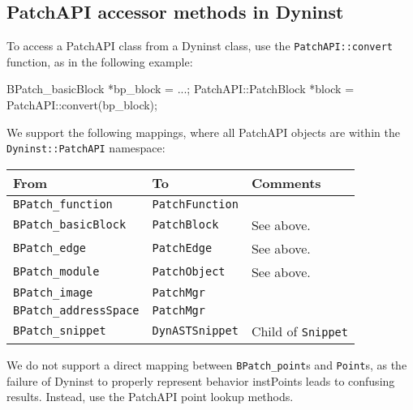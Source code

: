 \subsection{PatchAPI accessor methods in Dyninst}

To access a PatchAPI class from a Dyninst class, use
the \texttt{PatchAPI::convert} function, as in the following example:

\begin{apient}
  BPatch_basicBlock *bp_block = ...;
  PatchAPI::PatchBlock *block = PatchAPI::convert(bp_block);
\end{apient}

We support the following mappings, where all PatchAPI objects
are within the \texttt{Dyninst::PatchAPI} namespace:

\begin{tabular}{|l|l|l|}
\hline
From & To & Comments \\
\hline 
\texttt{BPatch\_function} & \texttt{PatchFunction} & \\
\texttt{BPatch\_basicBlock} & \texttt{PatchBlock} & See above. \\
\texttt{BPatch\_edge} & \texttt{PatchEdge} & See above. \\
\texttt{BPatch\_module} & \texttt{PatchObject} & See above. \\
\texttt{BPatch\_image} & \texttt{PatchMgr} & \\
\texttt{BPatch\_addressSpace} & \texttt{PatchMgr} & \\
\texttt{BPatch\_snippet} & \texttt{DynASTSnippet} & Child of \texttt{Snippet} \\
\hline
\end{tabular}

We do not support a direct mapping between \texttt{BPatch\_point}s
and \texttt{Point}s, as the failure of Dyninst to properly represent
behavior instPoints leads to confusing results. Instead, use
the PatchAPI point lookup methods. 
    
